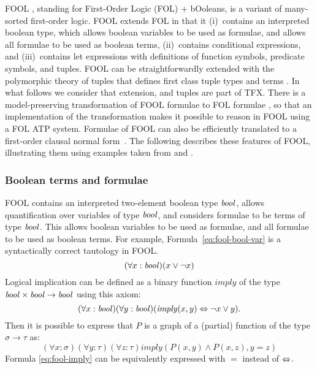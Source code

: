 \documentclass{easychair}
\begin{document}
FOOL \cite{KKV15}, standing for First-Order Logic (FOL) + bOoleans, is a 
variant of many-sorted first-order logic. 
FOOL extends FOL in that it (i)~contains an interpreted boolean type, which
allows boolean variables to be used as formulae, and allows all formulae to be 
used as boolean terms, (ii)~contains conditional expressions, and 
(iii)~contains let expressions with definitions of function symbols, predicate 
symbols, and tuples.
FOOL can be straightforwardly extended with the polymorphic theory of tuples 
that defines first class tuple types and terms \cite{KKV18}.
In what follows we consider that extension, and tuples are part of TFX.
There is a model-preserving transformation of FOOL formulae to FOL formulae
\cite{KKV15}, so that an implementation of the transformation makes it 
possible to reason in FOOL using a FOL ATP system.
Formulae of FOOL can also be efficiently translated to a first-order clausal 
normal form~\cite{KK+16-GCAI}. 
The following describes these features of FOOL, illustrating them using 
examples taken from \cite{KK+16} and \cite{KKV18}.

\subsubsection{Boolean terms and formulae}

FOOL contains an interpreted two-element boolean type $\mathit{bool}$, allows 
quantification over variables of type $\mathit{bool}$, and considers formulae to 
be terms of type $\mathit{bool}$.
This allows boolean variables to be used as formulae, and all formulae to be 
used as boolean terms.
For example, Formula~\ref{eq:fool-bool-var} is a syntactically correct 
tautology in FOOL.
\begin{equation}\label{eq:fool-bool-var}
(\forall x:\mathit{bool})(x \lor \neg x)
\end{equation}
Logical implication can be defined as a binary function
$\mathit{imply}$ of the type $\mathit{bool} \times \mathit{bool} \to \mathit{bool}$ using this axiom:
\begin{equation}\label{eq:fool-imply}
(\forall x:\mathit{bool})(\forall y:\mathit{bool})(\mathit{imply}(x,y) \Leftrightarrow \neg x \lor y).
\end{equation}
Then it is possible to express that $P$ is a graph of a (partial) function of 
the type $\sigma \to \tau$ as:
\begin{equation}\label{eq:bool-arg-example}
(\forall x:\sigma)(\forall y:\tau)(\forall z:\tau)
\mathit{imply}(P(x,y) \land P(x,z), y = z)
\end{equation}
Formula \ref{eq:fool-imply} can be equivalently expressed with $=$ instead of
$\Leftrightarrow$.
\end{document}
